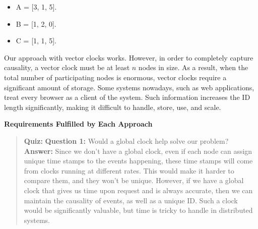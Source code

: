 \begin{enumerate}
\begin{itemize}
\tightlist
\item
A = {[}3, 1, 5{]}.
\item
B = {[}1, 2, 0{]}.
\item
C = {[}1, 1, 5{]}.
\end{itemize}
\end{enumerate}

Our approach with vector clocks works. However, in order to completely capture causality, a vector clock must be at least \protect{}\label{katex_inline_3oVYVcul2l_qf_hg5hQKJ}{{{\(n\)}}} nodes in size. As a result, when the total number of participating nodes is enormous, vector clocks require a significant amount of storage. Some systems nowadays, such as web applications, treat every browser as a client of the system. Such information increases the ID length significantly, making it difficult to handle, store, use, and scale.

\textbf{Requirements Fulfilled by Each Approach}

\begin{table}[htbp]
\centering
\small
{}
\caption{Requirements Fulfilled by Each Approach}
\end{table}

\begin{quote}
\textbf{Quiz:}
\textbf{Question 1:} Would a global clock help solve our problem?
\textbf{Answer:} Since we don't have a global clock, even if each node can assign unique time stamps to the events happening, these time stamps will come from clocks running at different rates. This would make it harder to compare them, and they won't be unique. However, if we have a global clock that gives us time upon request and is always accurate, then we can maintain the causality of events, as well as a unique ID. Such a clock would be significantly valuable, but time is tricky to handle in distributed systems.
\end{quote}

